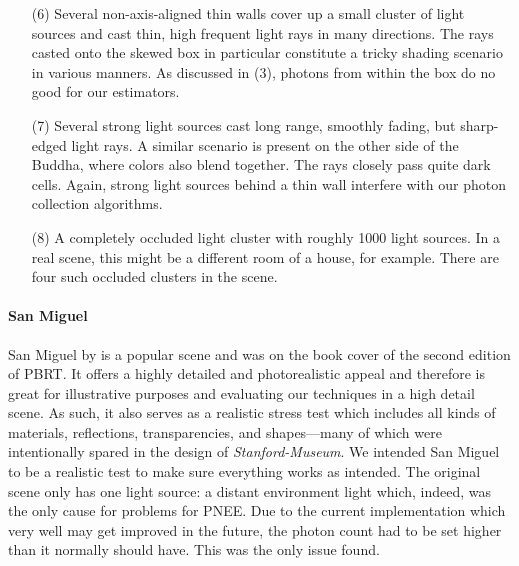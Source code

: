 \begin{itemize}
    \item[(6)] Several non-axis-aligned thin walls cover up a small cluster of light sources and cast thin, high frequent light rays in many directions. The rays casted onto the skewed box in particular constitute a tricky shading scenario in various manners. As discussed in (3), photons from within the box do no good for our estimators. 
    \item[(7)] Several strong light sources cast long range, smoothly fading, but sharp-edged light rays. A similar scenario is present on the other side of the Buddha, where colors also blend together. The rays closely pass quite dark cells. Again, strong light sources behind a thin wall interfere with our photon collection algorithms.
    \item[(8)] A completely occluded light cluster with roughly 1000 light sources. In a real scene, this might be a different room of a house, for example. There are four such occluded clusters in the scene.
\label{li:stanfordmuseum}
\end{itemize}
\paragraph{San Miguel}
\label{sec:sanmiguel}
San Miguel by \textcite{Sanmiguel} is a popular scene and was on the book cover of the second edition of PBRT. It offers a highly detailed and photorealistic appeal and therefore is great for illustrative purposes and evaluating our techniques in a high detail scene. As such, it also serves as a realistic stress test which includes all kinds of materials, reflections, transparencies, and shapes---many of which were intentionally spared in the design of \textit{Stanford-Museum}. We intended San Miguel to be a realistic test to make sure everything works as intended. The original scene only has one light source: a distant environment light which, indeed, was the only cause for problems for PNEE. Due to the current implementation which very well may get improved in the future, the photon count had to be set higher than it normally should have. This was the only issue found.

